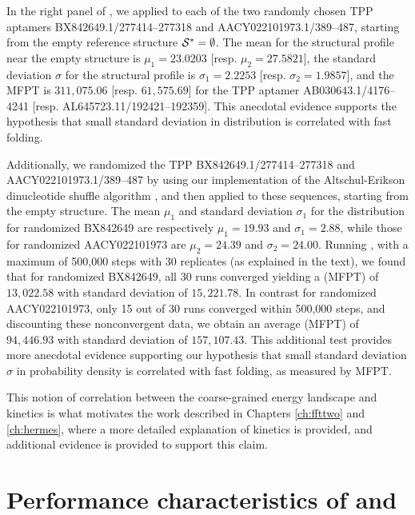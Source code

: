 In the right panel of , we
applied \fftbor to each of the two randomly chosen TPP \rb
aptamers BX842649.1/277414--277318 and AACY022101973.1/389--487, starting
from the empty reference structure $\mathcal S^*=\emptyset$.
The mean for the \fftbor structural profile near the empty
structure is $\mu_1=23.0203$  [resp. $\mu_2=27.5821$], the
standard deviation $\sigma$ for the \fftbor structural profile
is $\sigma_1=2.2253$  [resp. $\sigma_2=1.9857$], and the \kinfold MFPT is
$311,075.06$ [resp. $61,575.69$] for the TPP \rb aptamer
AB030643.1/4176--4241 [resp.  AL645723.11/192421--192359]. This anecdotal evidence supports the hypothesis that small standard deviation in \fftbor distribution is correlated with fast folding.

Additionally, we randomized the TPP \rbs BX842649.1/277414--277318 and AACY022101973.1/389--487 by using our implementation of the Altschul-Erikson dinucleotide shuffle algorithm
\citep{altschulErikson:dinucleotideShuffle}, and then applied \fftbor to these
sequences, starting from the empty structure.  The mean $\mu_1$ and standard
deviation $\sigma_1$ for the \fftbor distribution for randomized BX842649 are
respectively $\mu_1=19.93$ and $\sigma_1=2.88$, while those for randomized
AACY022101973 are $\mu_2=24.39$ and $\sigma_2=24.00$. Running \kinfold, with a
maximum of 500,000 steps with 30 replicates (as explained in the text), we
found
that for randomized BX842649, all 30 runs converged yielding a \mfpt
(MFPT) of $13,022.58$ with standard deviation of $15,221.78$. In contrast for
randomized AACY022101973, only 15 out of 30 runs converged within 500,000 steps,
and discounting these nonconvergent data, we obtain an average \mfpt
(MFPT) of $94,446.93$ with standard deviation of $157,107.43$. This additional
test provides more anecdotal evidence supporting our hypothesis that small
standard deviation $\sigma$ in \fftbor probability density is correlated with fast folding, as measured by MFPT.

This notion of correlation between the coarse-grained energy landscape and
kinetics is what motivates the work described in Chapters \ref{ch:ffttwo}
and \ref{ch:hermes}, where a more detailed explanation of kinetics is provided,
and additional evidence is provided to support this claim.

\section{Performance characteristics of \fftbor and \rnabor}
\label{sec:fftbor:speed}

